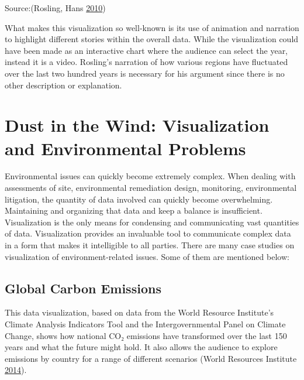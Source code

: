 \documentclass[]{book}
\begin{document}
Source:(Rosling, Hans \protect\hyperlink{ref-hans_rosling}{2010})

What makes this visualization so well-known is its use of animation and narration to highlight different stories within the overall data. While the visualization could have been made as an interactive chart where the audience can select the year, instead it is a video. Rosling's narration of how various regions have fluctuated over the last two hundred years is necessary for his argument since there is no other description or explanation.

\hypertarget{dust-in-the-wind-visualization-and-environmental-problems}{%
\section{Dust in the Wind: Visualization and Environmental Problems}\label{dust-in-the-wind-visualization-and-environmental-problems}}

Environmental issues can quickly become extremely complex. When dealing with assessments of site, environmental remediation design, monitoring, environmental litigation, the quantity of data involved can quickly become overwhelming. Maintaining and organizing that data and keep a balance is insufficient. Visualization is the only means for condensing and communicating vast quantities of data. Visualization provides an invaluable tool to communicate complex data in a form that makes it intelligible to all parties. There are many case studies on visualization of environment-related issues. Some of them are mentioned below:

\hypertarget{global-carbon-emissions}{%
\subsection{Global Carbon Emissions}\label{global-carbon-emissions}}

This data visualization, based on data from the World Resource Institute's Climate Analysis Indicators Tool and the Intergovernmental Panel on Climate Change, shows how national CO₂ emissions have transformed over the last 150 years and what the future might hold. It also allows the audience to explore emissions by country for a range of different scenarios (World Resources Institute \protect\hyperlink{ref-CO2_emission}{2014}).
\end{document}
